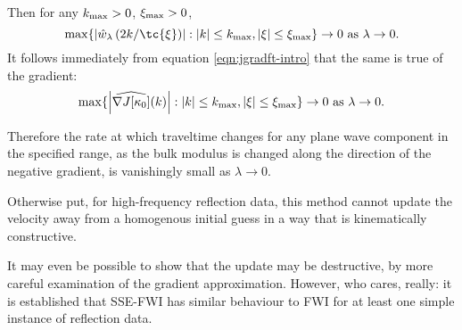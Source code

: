 Then for any $k_{\rm max} >0$, $\xi_{\rm max} > 0$,
\[
\max \{\left|\hat{w}_{\lambda}\left(2k/\tc{\xi}\right)\right|:
|k|\le k_{\rm max}, |\xi|\le \xi_{\rm max} \} \rightarrow 0\mbox{ as }
\lambda \rightarrow 0.
\]
It follows immediately from equation \ref{eqn:jgradft-intro} that the
same is true of the gradient:
\begin{equation}
\label{eqn:bigdeal}
\max \{\left|\widehat{\nabla J[\kappa_0]}(k)\right|:
|k|\le k_{\rm max}, |\xi|\le \xi_{\rm max} \} \rightarrow 0\mbox{ as }
\lambda \rightarrow 0.
\end{equation}

Therefore the rate at which traveltime changes for any plane wave
component in the specified range, as the bulk modulus is changed along
the direction of the negative gradient, is vanishingly small as
$\lambda \rightarrow 0$. 

Otherwise put, for high-frequency reflection data, this method cannot
update the velocity away from a homogenous initial guess in a way that
is kinematically constructive.

It may even be possible to show that the update may be destructive, by
more careful examination of the gradient approximation. However, who
cares, really: it is established that SSE-FWI has similar behaviour to
FWI for at least one simple instance of reflection data.

